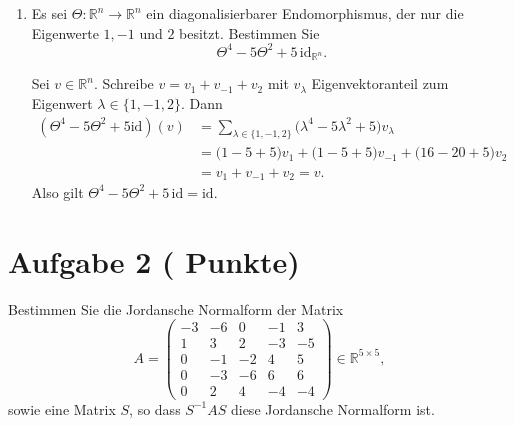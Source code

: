 \documentclass[11pt, a4paper]{article}
\newcommand{\aufgabe}[2]{%
  \section*{\Large\bfseries Aufgabe #1%
  \if\relax\detokenize{#2}\relax\else \hfill\normalfont\normalsize(#2 Punkte)\fi}%
  \vspace{-1.5ex}
}
\begin{document}
\begin{enumerate}
  \item Es sei $\Theta:\mathbb{R}^n\to\mathbb{R}^n$ ein diagonalisierbarer Endomorphismus, der nur die Eigenwerte $1,-1$ und $2$ besitzt. Bestimmen Sie
  \[
    \Theta^4-5\Theta^2+5\,\mathrm{id}_{\mathbb{R}^n}.
  \]
  \begin{framed}
  Sei $v\in\mathbb{R}^n$. Schreibe $v=v_{1}+v_{-1}+v_{2}$ mit
  $v_\lambda$ Eigenvektoranteil zum Eigenwert $\lambda\in\{1,-1,2\}$. Dann
  \[
  \begin{aligned}
    (\Theta^4-5\Theta^2+5\mathrm{id})(v)
      &=\sum_{\lambda\in\{1,-1,2\}}\big(\lambda^4-5\lambda^2+5\big)v_\lambda\\
      &=\big(1-5+5\big)v_1+\big(1-5+5\big)v_{-1}
        +\big(16-20+5\big)v_2\\
      &=v_1+v_{-1}+v_2=v.
  \end{aligned}
  \]
  Also gilt $\Theta^4-5\Theta^2+5\,\mathrm{id}=\mathrm{id}$.
  \end{framed}
\end{enumerate}

\aufgabe{2}{}
Bestimmen Sie die Jordansche Normalform der Matrix
\[
A=
\begin{pmatrix}
-3 & -6 & 0 & -1 & 3\\
 1 &  3 & 2 & -3 & -5\\
 0 & -1 & -2 &  4 & 5\\
 0 & -3 & -6 &  6 & 6\\
 0 &  2 & 4 & -4 & -4
\end{pmatrix}\in\mathbb{R}^{5\times 5},
\]
sowie eine Matrix $S$, so dass $S^{-1}AS$ diese Jordansche Normalform ist.
\begin{framed}\end{framed}
\end{document}
